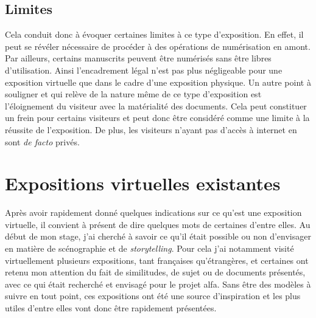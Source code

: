 	\subsection{Limites}
	Cela conduit donc à évoquer certaines limites à ce type d'exposition. En effet, il peut se révéler nécessaire de procéder à des opérations de numérisation en amont. Par ailleurs, certains manuscrits peuvent être numérisés sans être libres d'utilisation. Ainsi l'encadrement légal n'est pas plus négligeable pour une exposition virtuelle que dans le cadre d'une exposition physique. Un autre point à souligner et qui relève de la nature même de ce type d'exposition est l'éloignement du visiteur avec la matérialité des documents. Cela peut constituer un frein pour certains visiteurs et peut donc être considéré comme une limite à la réussite de l'exposition. De plus, les visiteurs n'ayant pas d'accès à internet en sont \textit{de facto} privés. 
	

	\section{Expositions virtuelles existantes}
	Après avoir rapidement donné quelques indications sur ce qu'est une exposition virtuelle, il convient à présent de dire quelques mots de certaines d'entre elles. Au début de mon stage, j'ai cherché à savoir ce qu'il était possible ou non d'envisager en matière de scénographie et de \textit{storytelling}. Pour cela j'ai notamment visité virtuellement plusieurs expositions, tant françaises qu'étrangères, et certaines ont retenu mon attention du fait de similitudes, de sujet ou de documents présentés, avec ce qui était recherché et envisagé pour le projet \acrshort{alfa}. Sans être des modèles à suivre en tout point, ces expositions ont été une source d'inspiration et les plus utiles d'entre elles vont donc être rapidement présentées. 
	
